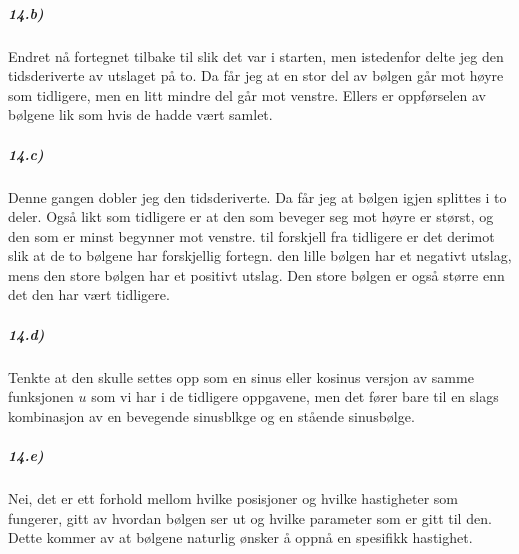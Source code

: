 \documentclass[11pt, A4paper,norsk]{article}
\begin{document}
			\subparagraph{14.b)}
				\begin{flushleft}
Endret nå fortegnet tilbake til slik det var i starten, men istedenfor delte jeg den tidsderiverte  av utslaget på to. Da får jeg at en stor del av bølgen går mot høyre som tidligere, men en litt mindre del går mot venstre. Ellers er oppførselen av bølgene lik som hvis de hadde vært samlet.
				\end{flushleft}








			\subparagraph{14.c)}
				\begin{flushleft}
Denne gangen dobler jeg den tidsderiverte. Da får jeg at bølgen igjen splittes i to deler. Også likt som tidligere er at den som beveger seg mot høyre er størst, og den som er minst begynner mot venstre. til forskjell fra tidligere er det derimot slik at de to bølgene har forskjellig fortegn. den lille bølgen har et negativt utslag, mens den store bølgen har et positivt utslag. Den store bølgen er også større enn det den har vært tidligere.
				\end{flushleft}









			\subparagraph{14.d)}
				\begin{flushleft}
Tenkte at den skulle settes opp som en sinus eller kosinus versjon av samme funksjonen $u$ som vi har i de tidligere oppgavene, men det fører bare til en slags kombinasjon av en bevegende sinusblkge og en stående sinusbølge.
				\end{flushleft}









			\subparagraph{14.e)}
				\begin{flushleft}
Nei, det er ett forhold mellom hvilke posisjoner og hvilke hastigheter som fungerer, gitt av hvordan bølgen ser ut og hvilke parameter som er gitt til den. Dette kommer av at bølgene naturlig ønsker å oppnå en spesifikk hastighet.
				\end{flushleft}
\end{document}
